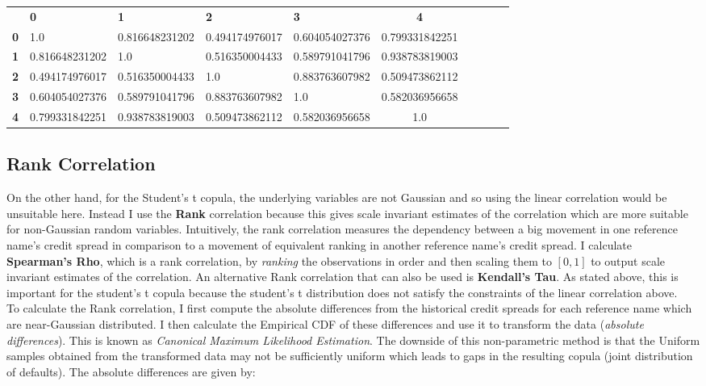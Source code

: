 \documentclass{report}
\theoremstyle{plain}
\theoremstyle{definition}
\begin{document}
\begin{center}
	\begin{tabular}{|l|l|l|l|l|c|c|c|c|c|}
		\hline
		& \textbf{0} & \textbf{1} & \textbf{2} & \textbf{3} & \textbf{4}\\\hhline{|=|=|=|=|=|=|}
		\textbf{0} & 1.0 & 0.816648231202 & 0.494174976017 & 0.604054027376 & 0.799331842251\\
		\textbf{1} & 0.816648231202 & 1.0 & 0.516350004433 & 0.589791041796 & 0.938783819003\\
		\textbf{2} & 0.494174976017 & 0.516350004433 & 1.0 & 0.883763607982 & 0.509473862112\\
		\textbf{3} & 0.604054027376 & 0.589791041796 & 0.883763607982 & 1.0 & 0.582036956658\\
		\textbf{4} & 0.799331842251 & 0.938783819003 & 0.509473862112 & 0.582036956658 & 1.0\\
		\hline
	\end{tabular}
\end{center}

\subsection{Rank Correlation}

On the other hand, for the Student's t copula, the underlying variables are not Gaussian and so using the linear correlation would be unsuitable here. Instead I use the \textbf{Rank} correlation because this gives scale invariant estimates of the correlation which are more suitable for non-Gaussian random variables. Intuitively, the rank correlation measures the dependency between a big movement in one reference name's credit spread in comparison to a movement of equivalent ranking in another reference name's credit spread. I calculate \textbf{Spearman's Rho}, which is a rank correlation, by \emph{ranking} the observations in order and then scaling them to $[0,1]$ to output scale invariant estimates of the correlation. An alternative Rank correlation that can also be used is \textbf{Kendall's Tau}. As stated above, this is important for the student's t copula because the student's t distribution does not satisfy the constraints of the linear correlation above. \\

To calculate the Rank correlation, I first compute the absolute differences from the historical credit spreads for each reference name which are near-Gaussian distributed. I then calculate the Empirical CDF of these differences and use it to transform the data (\textit{absolute differences}). This is known as \emph{Canonical Maximum Likelihood Estimation}. The downside of this non-parametric method is that the Uniform samples obtained from the transformed data may not be sufficiently uniform which leads to gaps in the resulting copula (joint distribution of defaults). The absolute differences are given by:
\end{document}
